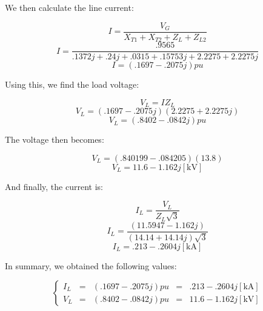 \begin{enumerate}
    We then calculate the line current:

    $$I=\frac{V_G}{X_{T1}+X_{T2}+Z_L+Z_{L2}}$$
    $$I=\frac{.9565}{.1372j+.24j+.0315+.15753j+2.2275+2.2275j}$$
    $$\boxed{I=(.1697-.2075j)pu}$$

    Using this, we find the load voltage:

    $$V_L=IZ_L$$
    $$V_L=(.1697-.2075j)(2.2275+2.2275j)$$
    $$\boxed{V_L=(.8402-.0842j)pu}$$

    The voltage then becomes:

    $$V_L=(.840199-.084205)(13.8)$$
    $$\boxed{V_L=11.6-1.162j[\si{\kilo\volt}]}$$

    And finally, the current is:

    $$I_L=\frac{V_L}{Z_L\sqrt{3}}$$
    $$I_L=\frac{(11.5947-1.162j)}{(14.14+14.14j)\sqrt{3}}$$
    $$\boxed{I_L=.213-.2604j[\si{\kilo\ampere}]}$$

    In summary, we obtained the following values:

    $$\boxed{\left\{\begin{array}{lllll} I_L&=& (.1697-.2075j)pu&=&.213-.2604j[\si{\kilo\ampere}]\\ V_L&=& (.8402-.0842j)pu&=&11.6-1.162j[\si{\kilo\volt}]\end{array}}$$

\end{enumerate}



